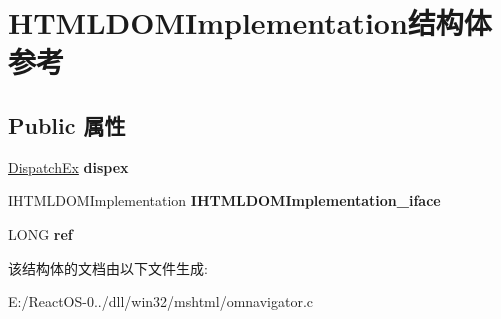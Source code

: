 \hypertarget{struct_h_t_m_l_d_o_m_implementation}{}\section{H\+T\+M\+L\+D\+O\+M\+Implementation结构体 参考}
\label{struct_h_t_m_l_d_o_m_implementation}
\subsection*{Public 属性}
\begin{DoxyCompactItemize}
\item 
\mbox{\label{struct_h_t_m_l_d_o_m_implementation_a46334f2b74cfc5ac84e00632e080296f}} 
\hyperlink{struct_dispatch_ex}{Dispatch\+Ex} {\bfseries dispex}
\item 
\mbox{\label{struct_h_t_m_l_d_o_m_implementation_adc4cc6aa68406608f688c829e8f7d9b6}} 
I\+H\+T\+M\+L\+D\+O\+M\+Implementation {\bfseries I\+H\+T\+M\+L\+D\+O\+M\+Implementation\+\_\+iface}
\item 
\mbox{\label{struct_h_t_m_l_d_o_m_implementation_a46413092f22d51f44f86f42c952e600b}} 
L\+O\+NG {\bfseries ref}
\end{DoxyCompactItemize}


该结构体的文档由以下文件生成\+:\begin{DoxyCompactItemize}
\item 
E\+:/\+React\+O\+S-\/0../dll/win32/mshtml/omnavigator.\+c\end{DoxyCompactItemize}
